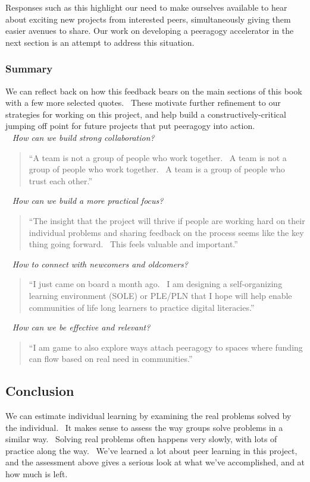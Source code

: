 Responses such as this highlight our need to make ourselves available to
hear about exciting new projects from interested peers, simultaneously
giving them easier avenues to share. Our work on developing a peeragogy
accelerator in the next section is an attempt to address this situation.

\subsubsection{Summary}

\noindent We can reflect back on how this feedback bears on the main sections of
this book with a few more selected quotes.~ These motivate further
refinement to our strategies for working on this project, and help build
a constructively-critical jumping off point for future projects that put
peeragogy into action. \\

~ \emph{How can we build strong
collaboration?} 

\begin{quote}
``A team is not a group of people who work together.~ A
team is not a group of people who work together.~ A team is a group of
people who trust each other.''
\end{quote}

~ \emph{How can we build
a more practical focus?}
\begin{quote}
``The insight that the project will thrive if people are working hard
  on their individual problems and sharing feedback on the process
  seems like the key thing going forward.~ This feels valuable and
  important.''
\end{quote}

~ \emph{How to connect with
  newcomers and oldcomers?}
\begin{quote}
``I just came on board a month ago.~ I am designing a self-organizing
  learning environment (SOLE) or PLE/PLN that I hope will help enable
  communities of life long learners to practice digital literacies.''
\end{quote}

~ \emph{How can we be effective and
relevant?}
\begin{quote}
``I am game to also explore ways attach peeragogy to spaces where
  funding can flow based on real need in communities.''
\end{quote}

\subsection{Conclusion}

We can estimate individual learning by examining the real problems
solved by the individual.~ It makes sense to assess the way groups solve
problems in a similar way.~ Solving real problems often happens very
slowly, with lots of practice along the way.~ We've learned a lot about
peer learning in this project, and the assessment above gives a serious
look at what we've accomplished, and at how much is left.
